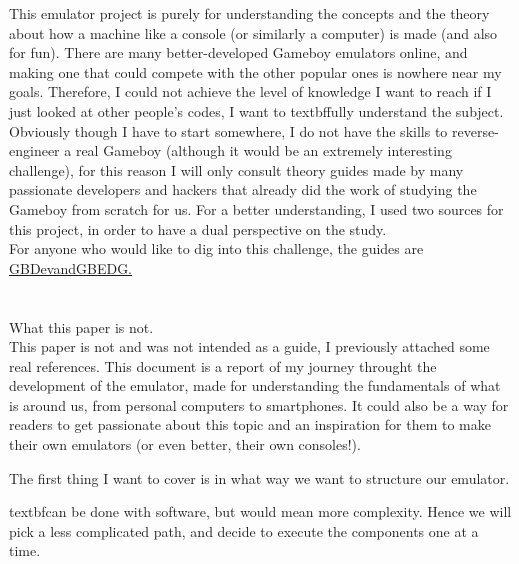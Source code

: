 \documentclass{article}
\begin{document}
\newpage
This emulator project is purely for understanding the concepts and the theory about how a machine like a console (or similarly a computer) is made (and also for fun). There are many better-developed Gameboy emulators online, and making one that could compete with the other popular ones is nowhere near my goals. Therefore, I could not achieve the level of knowledge I want to reach if I just looked at other people's codes, I want to
textbf{fully}
understand the subject. Obviously though I have to start somewhere, I do not have the skills to reverse-engineer a real Gameboy (although it would be an extremely interesting challenge), for this reason I will only consult theory guides made by many passionate developers and hackers that already did the work of studying the Gameboy from scratch for us. For a better understanding, I used two sources for this project, in order to have a dual perspective on the study.\\
For anyone who would like to dig into this challenge, the guides are
\href{https://gbdev.io/}{GBDevand}\href{https://hacktix.github.io/GBEDG/}{GBEDG. \\\\\\}What this paper is not. \\
This paper is not and was not intended as a guide, I previously attached some real references. This document is a report of my journey throught the development of the emulator, made for understanding the fundamentals of what is around us, from personal computers to smartphones. It could also be a way for readers to get passionate about this topic and an inspiration for them to make their own emulators (or even better, their own consoles!).

\newpage
The first thing I want to cover is in what way we want to structure our emulator.

textbf{can}
be done with software, but would mean more complexity. Hence we will pick a less complicated path, and decide to execute the components one at a time.

\end{document}

